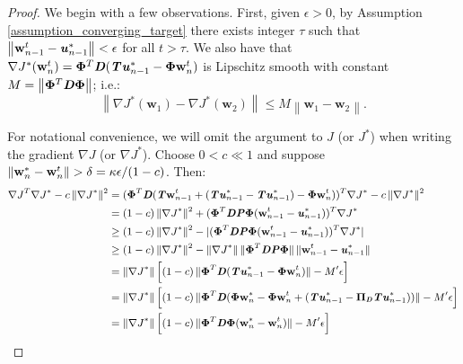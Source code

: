 \documentclass{article}
\renewcommand{\vec}[1]{\textbf{\textit{#1}}}
\newcommand{\target}{\vec{u}}
\newcommand{\params}{\textbf{w}}
\newcommand{\Features}{\bm{\Phi}}
\newcommand{\transitionmtx}{\textbf{\textit{P}}}
\newcommand{\projectionmtx}{\bm{\Pi}}
\newcommand{\densitymtx}{\textbf{\textit{D}}}
\newcommand{\bellmanop}{\textbf{\textit{T}}}
\newcommand{\norm}[1]{\left\lVert #1 \right\rVert}
\newcommand{\smashednorm}[1]{\left\lVert \smash{#1} \right\rVert}
\begin{document}
\begin{proof}
	We begin with a few observations. First, given $\epsilon > 0$, by Assumption \ref{assumption_converging_target} there exists integer $\tau$ such that $\norm{\params_{n-1}^t - \target^*_{n-1}} < \epsilon$ for all $t > \tau$.
	We also have that $\nabla J^*(\params_n^t) = \Features^T\densitymtx(\bellmanop\target^*_{n-1} - \Features\params_n^t)$ is Lipschitz smooth with constant $M = \norm{\Features^T\densitymtx\Features}$; i.e.:
		\begin{equation}
			\norm{\nabla J^*(\params_1) - \nabla J^*(\params_2)} \leq M\!\norm{\params_1 - \params_2}.
		\end{equation}

	For notational convenience, we will omit the argument to $J$ (or $J^*$) when writing the gradient $\nabla J$ (or $\nabla J^*$). Choose $0 < c \ll 1$ and suppose $\smashednorm{\params_n^* - \params_n^t} > \delta = \kappa\epsilon/(1-c)$. Then:
	\begin{equation}
	\small
	\begin{split}
	\nabla J^T\nabla J^*	 - c\smashednorm{\nabla J^*	}^2 &= (\Features^T\densitymtx(\bellmanop\params_{n-1}^t + (\bellmanop\target^*_{n-1}  - \bellmanop\target^*_{n-1}) - \Features\params_n^t))^T\nabla J^*	 - c\smashednorm{\nabla J^*	}^2\\
	&=(1 - c)\smashednorm{\nabla J^*	}^2  + (\Features^T\densitymtx\transitionmtx\Features(\params_{n-1}^t - \target^*_{n-1}))^T\nabla J^*	 \\
	&\geq (1 - c)\smashednorm{\nabla J^*	}^2  - \vert (\Features^T\densitymtx\transitionmtx\Features(\params_{n-1}^t - \target^*_{n-1}))^T\nabla J^* \vert \\
	&\geq (1 - c)\smashednorm{\nabla J^*	}^2  - \smashednorm{\nabla J^*}\smashednorm{\smash{\Features^T\densitymtx\transitionmtx\Features}}\smashednorm{\params_{n-1}^t - \target^*_{n-1}} \\
	&= \smashednorm{\nabla J^*	}\Big[(1 - c)\smashednorm{\Features^T\densitymtx(\bellmanop\target^*_{n-1} - \Features\params_n^t)}  - M'\epsilon\Big] \\
	&= \smashednorm{\nabla J^*	}\Big[(1 - c)\smashednorm{\Features^T\densitymtx(\Features\params_n^* - \Features\params_n^t  + (\bellmanop\target^*_{n-1} - \projectionmtx_\densitymtx\bellmanop\target^*_{n-1}))}  - M'\epsilon\Big] \\
	&= \smashednorm{\nabla J^*	}\Big[(1 - c)\smashednorm{\Features^T\densitymtx\Features(\params_n^* - \params_n^t)}  - M'\epsilon\Big] \\

\end{split}
\end{equation}
\end{proof}
\end{document}
